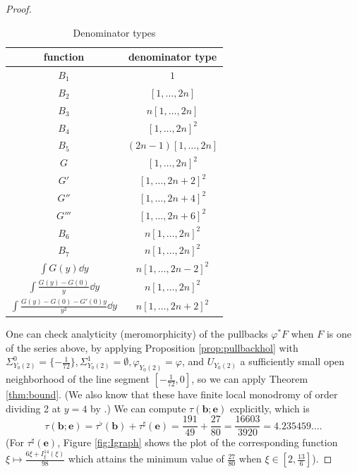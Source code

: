 \begin{proof}
\begin{table}[t]
    \centering
    \begin{tabular}{ c|c } 
    function & denominator type \\
    \midrule
    \midrule
    $B_1$ & $1$ \\
     \midrule
    $B_2$ & $[1, \dots, 2n]$ \\
     \midrule
    $B_3$ & $n [1, \dots, 2n]$ \\
     \midrule
    $B_4$ & $[1, \dots, 2n]^2$\\
     \midrule
    $B_5$ & $(2n-1)[1, \dots, 2n]$\\
     \midrule
    $G$ & $[1, \dots, 2n]^2$ \\
     \midrule
    $G'$ & $[1, \dots, 2n+2]^2$ \\
     \midrule
    $G''$ & $[1, \dots, 2n+4]^2$ \\
     \midrule
    $G'''$ & $[1, \dots, 2n+6]^2$ \\
     \midrule
    $B_6$ & $n[1, \dots, 2n]^2$ \\
     \midrule
    $B_7$ & $n[1, \dots, 2n]^2$ \\
     \midrule
    $\int G(y) \dd y$ & $n[1, \dots, 2n-2]^2$ \\
     \midrule
    $\int \frac{G(y) - G(0)}{y} \dd y$ & $n[1, \dots, 2n]^2$ \\
     \midrule
    $\int \frac{G(y) - G(0) - G'(0)y}{y^2} \dd y$ & $n[1, \dots, 2n+2]^2$ \\
    \end{tabular}
    \caption{Denominator types}
    \label{tab:denom}
\end{table}


One can check analyticity (meromorphicity) of the pullbacks $\varphi^\ast F$ when $F$ is one of the series above, by applying Proposition \ref{prop:pullbackhol} with $\Sigma_{Y_0(2)}^0 = \{-\frac{1}{72}\}, \Sigma_{Y_0(2)}^1 = \emptyset, \varphi_{Y_0(2)} = \varphi$, and $U_{Y_0(2)}$ a sufficiently small open neighborhood of the line segment $[-\frac{1}{72}, 0]$, so we can apply Theorem \ref{thm:bound}.
(We also know that these have finite local monodromy of order dividing 2 at $y = 4$ by \cite[Lemma 9.0.3]{calegari2024linear}.)
We can compute $\tau(\mathbf{b}; \mathbf{e})$ explicitly, which is
$$
    \tau(\mathbf{b}; \mathbf{e}) = \tau^\flat(\mathbf{b}) + \tau^\sharp(\mathbf{e}) = \frac{191}{49} + \frac{27}{80} = \frac{16603}{3920} = 4.235459\dots.
$$
(For $\tau^\sharp(\mathbf{e})$, Figure \ref{fig:Igraph} shows the plot of the corresponding function $\xi \mapsto \frac{6\xi + I_{\xi}^{14}(\xi)}{98}$ which attains the minimum value of $\frac{27}{80}$ when $\xi \in [2, \frac{13}{6}]$).


\end{proof}
